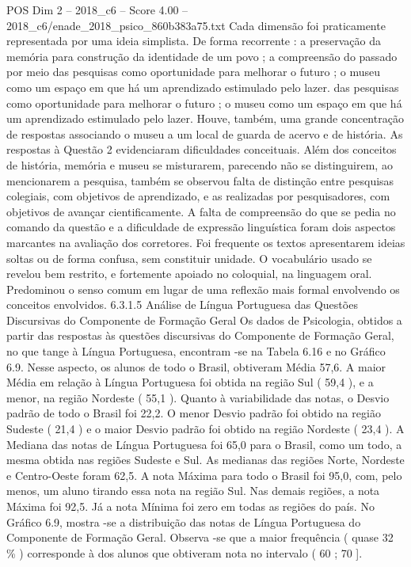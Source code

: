 \begin{textsample}{POS Dim 2 – 2018\_c6 – Score 4.00 – 2018\_c6/enade\_2018\_psico\_860b383a75.txt}
Cada dimensão foi praticamente representada por uma ideia simplista.
De forma recorrente : a preservação da memória para construção da identidade de um povo ; a compreensão do passado por meio das pesquisas como oportunidade para melhorar o futuro ; o museu como um espaço em que há um aprendizado estimulado pelo lazer. das pesquisas como oportunidade para melhorar o futuro ; o museu como um espaço em que há um aprendizado estimulado pelo lazer.
Houve, também, uma grande concentração de respostas associando o museu a um local de guarda de acervo e de história.
As respostas à Questão 2 evidenciaram dificuldades conceituais.
Além dos conceitos de história, memória e museu se misturarem, parecendo não se distinguirem, ao mencionarem a pesquisa, também se observou falta de distinção entre pesquisas colegiais, com objetivos de aprendizado, e as realizadas por pesquisadores, com objetivos de avançar cientificamente.
A falta de compreensão do que se pedia no comando da questão e a dificuldade de expressão linguística foram dois aspectos marcantes na avaliação dos corretores.
Foi frequente os textos apresentarem ideias soltas ou de forma confusa, sem constituir unidade.
O vocabulário usado se revelou bem restrito, e fortemente apoiado no coloquial, na linguagem oral.
Predominou o senso comum em lugar de uma reflexão mais formal envolvendo os conceitos envolvidos. 6.3.1.5 Análise de Língua Portuguesa das Questões Discursivas do Componente de Formação Geral Os dados de Psicologia, obtidos a partir das respostas às questões discursivas do Componente de Formação Geral, no que tange à Língua Portuguesa, encontram -se na Tabela 6.16 e no Gráfico 6.9.
Nesse aspecto, os alunos de todo o Brasil, obtiveram Média 57,6.
A maior Média em relação à Língua Portuguesa foi obtida na região Sul ( 59,4 ), e a menor, na região Nordeste ( 55,1 ).
Quanto à variabilidade das notas, o Desvio padrão de todo o Brasil foi 22,2.
O menor Desvio padrão foi obtido na região Sudeste ( 21,4 ) e o maior Desvio padrão foi obtido na região Nordeste ( 23,4 ).
A Mediana das notas de Língua Portuguesa foi 65,0 para o Brasil, como um todo, a mesma obtida nas regiões Sudeste e Sul.
As medianas das regiões Norte, Nordeste e Centro-Oeste foram 62,5.
A nota Máxima para todo o Brasil foi 95,0, com, pelo menos, um aluno tirando essa nota na região Sul.
Nas demais regiões, a nota Máxima foi 92,5.
Já a nota Mínima foi zero em todas as regiões do país.
No Gráfico 6.9, mostra -se a distribuição das notas de Língua Portuguesa do Componente de Formação Geral.
Observa -se que a maior frequência ( quase 32 \% ) corresponde à dos alunos que obtiveram nota no intervalo ( 60 ; 70 ].

\end{textsample}
